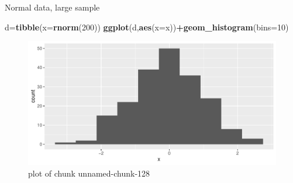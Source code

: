 \documentclass[
  ignorenonframetext,
]{beamer}
\newenvironment{Shaded}{\begin{snugshade}}{\end{snugshade}}
\newcommand{\DataTypeTok}[1]{\textcolor[rgb]{0.13,0.29,0.53}{#1}}
\newcommand{\DecValTok}[1]{\textcolor[rgb]{0.00,0.00,0.81}{#1}}
\newcommand{\KeywordTok}[1]{\textcolor[rgb]{0.13,0.29,0.53}{\textbf{#1}}}
\newcommand{\NormalTok}[1]{#1}
\newcommand{\OperatorTok}[1]{\textcolor[rgb]{0.81,0.36,0.00}{\textbf{#1}}}
\begin{document}
\begin{frame}[fragile]{Normal data, large sample}
\protect\hypertarget{normal-data-large-sample}{}

\begin{Shaded}
\begin{Highlighting}[]
\NormalTok{d=}\KeywordTok{tibble}\NormalTok{(}\DataTypeTok{x=}\KeywordTok{rnorm}\NormalTok{(}\DecValTok{200}\NormalTok{))}
\KeywordTok{ggplot}\NormalTok{(d,}\KeywordTok{aes}\NormalTok{(}\DataTypeTok{x=}\NormalTok{x))}\OperatorTok{+}\KeywordTok{geom_histogram}\NormalTok{(}\DataTypeTok{bins=}\DecValTok{10}\NormalTok{)}
\end{Highlighting}
\end{Shaded}

\begin{figure}
\centering
\includegraphics{figure/unnamed-chunk-128-1.pdf}
\caption{plot of chunk unnamed-chunk-128}
\end{figure}

\end{frame}
\end{document}
